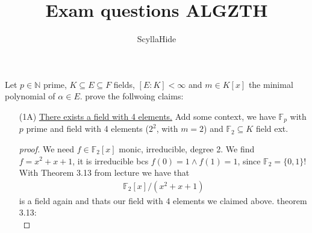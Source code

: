 \documentclass[]{scrartcl}
\title{Exam questions ALGZTH}
\author{ScyllaHide}
\newcommand{\N}{\mathbb{N}}
\newcommand{\F}{\mathbb{F}}
\newcommand{\<}{\trianglelefteq}
\begin{document}
\maketitle

Let $p \in \N$ prime, $K \subseteq E \subseteq F$ fields, $[E\colon K] < \infty$ and $m \in K[x]$ the minimal polynomial of $\alpha \in E$.
prove the follwoing claims:
\begin{itemize}
	\item[(1A)] \underline{There exists a field with 4 elements.} Add some context, we have $\F_p$ with $p$ prime and field with 4 elements ($2^2$, with $m = 2$) and $\F_2 \subseteq K$ field ext.
	\begin{proof}[proof]
		We need $f \in \F_2[x]$ monic, irreducible, degree 2. We find $f = x^2+x+1$, it is irreducible bcs $f(0) = 1 \wedge f(1) = 1$, since $\F_2 = \{0,1\}$! With Theorem 3.13 from lecture we have that
		\begin{align*}
			\F_2[x]/ (x^2+x+1)
		\end{align*} 
		is a field again and thats our field with 4 elements we claimed above.
		theorem 3.13:\\
		

\end{proof}
\end{itemize}
\end{document}
